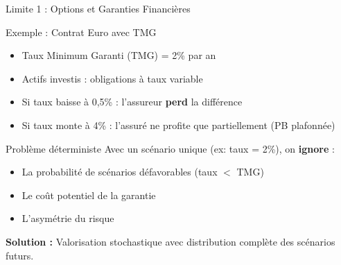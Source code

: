 \documentclass[10pt,aspectratio=169,xcolor={dvipsnames}]{beamer}
\begin{document}
\begin{frame}{Limite 1 : Options et Garanties Financières}
\begin{block}{Exemple : Contrat Euro avec TMG}
\begin{itemize}
    \item Taux Minimum Garanti (TMG) = 2\% par an
    \item Actifs investis : obligations à taux variable
    \item Si taux baisse à 0,5\% : l'assureur \textbf{perd} la différence
    \item Si taux monte à 4\% : l'assuré ne profite que partiellement (PB plafonnée)
\end{itemize}
\end{block}

\begin{alertblock}{Problème déterministe}
Avec un scénario unique (ex: taux = 2\%), on \textbf{ignore} :
\begin{itemize}
    \item La probabilité de scénarios défavorables (taux $<$ TMG)
    \item Le coût potentiel de la garantie
    \item L'asymétrie du risque
\end{itemize}
\end{alertblock}

\textbf{Solution : } Valorisation stochastique avec \alert{distribution complète} des scénarios futurs.
\end{frame}
\end{document}
